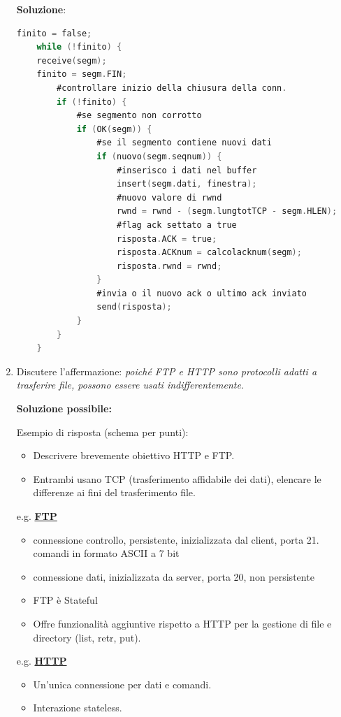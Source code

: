 \documentclass[11pt,a4paper,oneside]{book}
\theoremstyle{definition}
\begin{document}
\begin{enumerate}
	      \pagebreak

	      \begin{flushleft}
		      \textbf{Soluzione}:
		      \begin{lstlisting}[gobble=2,language=C,basicstyle=\footnotesize]
	finito = false;
	while (!finito) { 
	receive(segm);
	finito = segm.FIN; 
		#controllare inizio della chiusura della conn.
		if (!finito) {
			#se segmento non corrotto
			if (OK(segm)) { 
				#se il segmento contiene nuovi dati
				if (nuovo(segm.seqnum)) { 
					#inserisco i dati nel buffer
					insert(segm.dati, finestra); 
					#nuovo valore di rwnd
					rwnd = rwnd - (segm.lungtotTCP - segm.HLEN); 
					#flag ack settato a true
					risposta.ACK = true; 
					risposta.ACKnum = calcolacknum(segm);
					risposta.rwnd = rwnd;
				}
 				#invia o il nuovo ack o ultimo ack inviato
				send(risposta); 
			}
		}
	}
	\end{lstlisting}
	      \end{flushleft}
	\item Discutere l'affermazione: \textit{poiché FTP e HTTP sono protocolli adatti a trasferire file, possono essere usati indifferentemente}.
	      \begin{flushleft}
		      \textbf{Soluzione possibile:}
	      \end{flushleft}
	      Esempio di risposta (schema per punti):
	      \begin{itemize}
		      \item Descrivere brevemente obiettivo HTTP e FTP.
		      \item Entrambi usano TCP (trasferimento affidabile dei dati),  elencare le differenze ai fini del trasferimento file.
	      \end{itemize}
	      e.g.  \hyperref[sec:FTP]{\textbf{FTP}}
	      \begin{itemize}
		      \item connessione controllo, persistente, inizializzata dal client, porta 21. comandi in formato ASCII a 7 bit
		      \item connessione dati, inizializzata da server, porta 20, non persistente
		      \item  FTP è Stateful
		      \item Offre funzionalità aggiuntive rispetto a HTTP per la gestione di file e directory (list, retr, put).
	      \end{itemize}
	      e.g. \hyperref[sec:HTTP]{\textbf{HTTP}}
	      \begin{itemize}
		      \item Un'unica connessione per dati e comandi.
		      \item Interazione stateless.
	      \end{itemize}
\end{enumerate}
\end{document}
